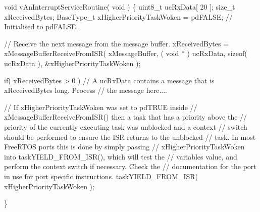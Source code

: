 \begin{DoxyPre}void vAnInterruptServiceRoutine( void )
\{
uint8\_t ucRxData[ 20 ];
size\_t xReceivedBytes;
BaseType\_t xHigherPriorityTaskWoken = pdFALSE;  // Initialised to pdFALSE.
\begin{DoxyVerb}// Receive the next message from the message buffer.
xReceivedBytes = xMessageBufferReceiveFromISR( xMessageBuffer,
                                              ( void * ) ucRxData,
                                              sizeof( ucRxData ),
                                              &xHigherPriorityTaskWoken );

if( xReceivedBytes > 0 )
{
    // A ucRxData contains a message that is xReceivedBytes long.  Process
    // the message here....
}

// If xHigherPriorityTaskWoken was set to pdTRUE inside
// xMessageBufferReceiveFromISR() then a task that has a priority above the
// priority of the currently executing task was unblocked and a context
// switch should be performed to ensure the ISR returns to the unblocked
// task.  In most FreeRTOS ports this is done by simply passing
// xHigherPriorityTaskWoken into taskYIELD_FROM_ISR(), which will test the
// variables value, and perform the context switch if necessary.  Check the
// documentation for the port in use for port specific instructions.
taskYIELD_FROM_ISR( xHigherPriorityTaskWoken );
\end{DoxyVerb}

\}
\end{DoxyPre}
 